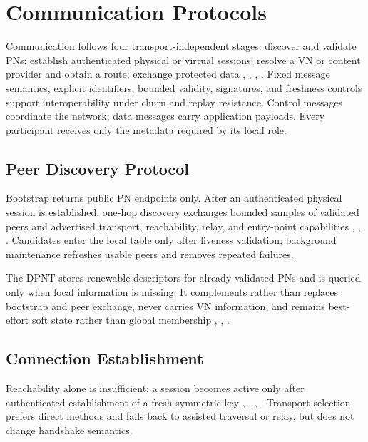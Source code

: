 \documentclass[
  12pt,
  oneside,
  a4paper,
  chapter=TITLE,
  section=TITLE,
  english,
  brazil
]{abntex2}
\begin{document}
\section{Communication Protocols}

Communication follows four transport-independent stages: discover and validate PNs; establish authenticated physical or virtual sessions; resolve a VN or content provider and obtain a route; exchange protected data \cite{li2022unreachable}, \cite{augustine2022byzantine}, \cite{mirzaei2018pk}, \cite{qian2016garlic}. Fixed message semantics, explicit identifiers, bounded validity, signatures, and freshness controls support interoperability under churn and replay resistance. Control messages coordinate the network; data messages carry application payloads. Every participant receives only the metadata required by its local role.

\subsection{Peer Discovery Protocol}

Bootstrap returns public PN endpoints only. After an authenticated physical session is established, one-hop discovery exchanges bounded samples of validated peers and advertised transport, reachability, relay, and entry-point capabilities \cite{li2022unreachable}, \cite{augustine2022byzantine}, \cite{qian2016garlic}. Candidates enter the local table only after liveness validation; background maintenance refreshes usable peers and removes repeated failures.

The DPNT stores renewable descriptors for already validated PNs and is queried only when local information is missing. It complements rather than replaces bootstrap and peer exchange, never carries VN information, and remains best-effort soft state rather than global membership \cite{li2022unreachable}, \cite{augustine2022byzantine}, \cite{qian2016garlic}.


\subsection{Connection Establishment}

Reachability alone is insufficient: a session becomes active only after authenticated establishment of a fresh symmetric key \cite{li2022unreachable}, \cite{mirzaei2018pk}, \cite{bos2017kyber}, \cite{nist2024fips203}. Transport selection prefers direct methods and falls back to assisted traversal or relay, but does not change handshake semantics.
\end{document}
